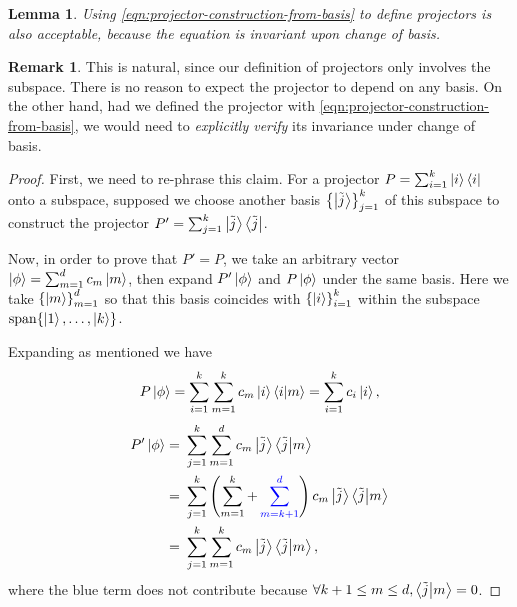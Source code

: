\documentclass{article}
\theoremstyle{definition}
\newtheorem{rem}{Remark}[section]
\theoremstyle{plain}
\newtheorem{lem}{Lemma}[section]
\numberwithin{equation}{section}
\begin{document}
\begin{lem}
    Using \cref{eqn:projector-construction-from-basis} 
    to define projectors is also acceptable, 
    because the equation is invariant upon 
    change of basis. 
\end{lem}

\begin{rem}
    This is natural, 
    since our definition of projectors only involves 
    the subspace. 
    There is no reason to expect the projector 
    to depend on any basis. 
    On the other hand, had we defined the projector 
    with \cref{eqn:projector-construction-from-basis}, 
    we would need to 
    \textit{explicitly verify} its invariance 
    under change of basis.
\end{rem}

\begin{proof}
    First, we need to re-phrase this claim. 
    For a projector 
    $P = \sum_{i = 1}^{k} \ket{i} \bra{i}$
    onto a subspace, supposed we choose another basis 
    $\left\{ \ket{\tilde{j}} \right\}_{j = 1}^{k}$ 
    of this subspace to construct the projector 
    $P' = 
    \sum_{j = 1}^{k} \ket{\tilde{j}} \bra{\tilde{j}}$.

    Now, in order to prove that 
    $P' = P$, 
    we take an arbitrary vector 
    $\ket{\phi} = 
    \sum_{m =1}^{d}c_m \ket{m}$, 
    then expand $P' \ket{\phi}$ and 
    $P \ket{\phi}$ under the same basis. 
    Here we take 
    $\left\{ \ket{m} \right\}_{m = 1}^{d}$ 
    so that this basis coincides with 
    $\left\{ \ket{i} \right\}_{i = 1}^{k}$ 
    within the subspace 
    $\operatorname{span} \{ \ket{1}, \ldots , \ket{k}\}$. 

    Expanding as mentioned we have 
    \begin{equation}
        P \ket{\phi}
        =
        \sum_{i = 1}^{k}
        \sum_{m = 1}^{k}
        c_m \ket{i} \bra{i} \ket{m}
        = \sum_{i = 1}^{k} c_i \ket{i},
    \end{equation}
    \begin{align}
        P' \ket{\phi} 
        =&\ 
        \sum_{j=1}^{k}\sum_{m=1}^{d}
        c_m \ket{\tilde{j}} \bra{\tilde{j}} \ket{m} \\
        =&\ 
        \sum_{j=1}^{k}
        \left( 
            \sum_{m=1}^{k}
            +
        \mathcolor{blue}{
            \sum_{m=k+1}^{d}
        }
         \right) 
        c_m \ket{\tilde{j}} \bra{\tilde{j}} \ket{m} \\
        =&\ 
        \sum_{j=1}^{k}\sum_{m=1}^{k}
        c_m \ket{\tilde{j}} \bra{\tilde{j}} \ket{m},
    \label{eqn:expansion-of-P-prime-phi-ket}
    \end{align}
    where the blue term does not contribute because 
    $\forall k+1 \le m \le d, 
    \bra{\tilde{j}} \ket{m} =0$.
    

\end{proof}
\end{document}
